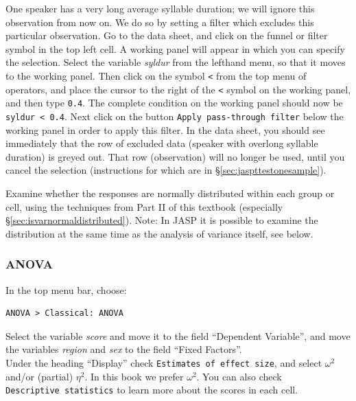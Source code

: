 \documentclass[
]{book}
\begin{document}
One speaker has a very long average syllable duration; we will ignore this observation from now on. We do so by setting a filter which excludes this particular observation. Go to the data sheet, and click on the funnel or filter symbol in the top left cell. A working panel will appear in which you can specify the selection.
Select the variable \emph{syldur} from the lefthand menu, so that it moves to the working panel. Then click on the symbol \texttt{\textless{}} from the top menu of operators, and place the cursor to the right of the \texttt{\textless{}} symbol on the working panel, and then type \texttt{0.4}. The complete condition on the working panel should now be \texttt{syldur\ \textless{}\ 0.4}.
Next click on the button \texttt{Apply\ pass-through\ filter} below the working panel in order to apply this filter. In the data sheet, you should see immediately that the row of excluded data (speaker with overlong syllable duration) is greyed out. That row (observation) will no longer be used, until you cancel the selection (instructions for which are in §\ref{sec:jaspttestonesample}).

Examine whether the responses are normally distributed within each group or cell, using the
techniques from Part II of this textbook (especially
§\ref{sec:isvarnormaldistributed}).
Note: In JASP it is possible to examine the distribution at the same time as the analysis of variance itself, see below.

\hypertarget{anova-3}{%
\subsubsection{ANOVA}\label{anova-3}}

In the top menu bar, choose:

\begin{verbatim}
ANOVA > Classical: ANOVA
\end{verbatim}

Select the variable \emph{score} and move it to the field ``Dependent Variable'', and move the variables \emph{region} and \emph{sex} to the field ``Fixed Factors''.\\
Under the heading ``Display'' check \texttt{Estimates\ of\ effect\ size}, and select \(\omega^2\) and/or (partial) \(\eta^2\). In this book we prefer \(\omega^2\).
You can also check \texttt{Descriptive\ statistics} to learn more about the scores in each cell.
\end{document}
